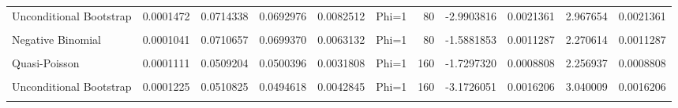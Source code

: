 \documentclass[border=1mm]{standalone}
\begin{document}
\begin{table}
\begin{tabular}{l|r|r|r|r|l|r|r|r|r|r}
\hline
\cellcolor{gray!10}{Sandwich} & \cellcolor{gray!10}{0.0001144} & \cellcolor{gray!10}{0.0710886} & \cellcolor{gray!10}{0.0694400} & \cellcolor{gray!10}{0.0077999} & \cellcolor{gray!10}{Phi=1} & \cellcolor{gray!10}{80} & \cellcolor{gray!10}{-2.3190547} & \cellcolor{gray!10}{0.0016486} & \cellcolor{gray!10}{2.805336} & \cellcolor{gray!10}{0.0016486}\\
\hline
Unconditional Bootstrap & 0.0001472 & 0.0714338 & 0.0692976 & 0.0082512 & Phi=1 & 80 & -2.9903816 & 0.0021361 & 2.967654 & 0.0021361\\
\hline
\cellcolor{gray!10}{Conditional Bootstrap} & \cellcolor{gray!10}{0.0000948} & \cellcolor{gray!10}{0.0714244} & \cellcolor{gray!10}{0.0692976} & \cellcolor{gray!10}{0.0082512} & \cellcolor{gray!10}{Phi=1} & \cellcolor{gray!10}{80} & \cellcolor{gray!10}{-2.9776596} & \cellcolor{gray!10}{0.0021268} & \cellcolor{gray!10}{2.967654} & \cellcolor{gray!10}{0.0021268}\\
\hline
Negative Binomial & 0.0001041 & 0.0710657 & 0.0699370 & 0.0063132 & Phi=1 & 80 & -1.5881853 & 0.0011287 & 2.270614 & 0.0011287\\
\hline
\cellcolor{gray!10}{Poisson} & \cellcolor{gray!10}{0.0001111} & \cellcolor{gray!10}{0.0509204} & \cellcolor{gray!10}{0.0500733} & \cellcolor{gray!10}{0.0014094} & \cellcolor{gray!10}{Phi=1} & \cellcolor{gray!10}{160} & \cellcolor{gray!10}{-1.6635585} & \cellcolor{gray!10}{0.0008471} & \cellcolor{gray!10}{1.000000} & \cellcolor{gray!10}{0.0008471}\\
\hline
Quasi-Poisson & 0.0001111 & 0.0509204 & 0.0500396 & 0.0031808 & Phi=1 & 160 & -1.7297320 & 0.0008808 & 2.256937 & 0.0008808\\
\hline
\cellcolor{gray!10}{Sandwich} & \cellcolor{gray!10}{0.0001111} & \cellcolor{gray!10}{0.0509204} & \cellcolor{gray!10}{0.0494987} & \cellcolor{gray!10}{0.0039483} & \cellcolor{gray!10}{Phi=1} & \cellcolor{gray!10}{160} & \cellcolor{gray!10}{-2.7920627} & \cellcolor{gray!10}{0.0014217} & \cellcolor{gray!10}{2.801450} & \cellcolor{gray!10}{0.0014217}\\
\hline
Unconditional Bootstrap & 0.0001225 & 0.0510825 & 0.0494618 & 0.0042845 & Phi=1 & 160 & -3.1726051 & 0.0016206 & 3.040009 & 0.0016206\\
\hline
\cellcolor{gray!10}{Conditional Bootstrap} & \cellcolor{gray!10}{0.0001435} & \cellcolor{gray!10}{0.0510715} & \cellcolor{gray!10}{0.0494618} & \cellcolor{gray!10}{0.0042845} & \cellcolor{gray!10}{Phi=1} & \cellcolor{gray!10}{160} & \cellcolor{gray!10}{-3.1517533} & \cellcolor{gray!10}{0.0016096} & \cellcolor{gray!10}{3.040009} & \cellcolor{gray!10}{0.0016096}\\

\end{tabular}
\end{table}
\end{document}
